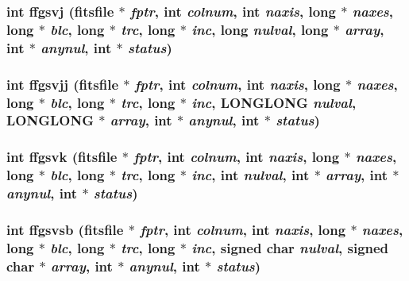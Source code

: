 \subsubsection{\setlength{\rightskip}{0pt plus 5cm}int ffgsvj (\bf{fitsfile} $\ast$ {\em fptr}, int {\em colnum}, int {\em naxis}, long $\ast$ {\em naxes}, long $\ast$ {\em blc}, long $\ast$ {\em trc}, long $\ast$ {\em inc}, long {\em nulval}, long $\ast$ {\em array}, int $\ast$ {\em anynul}, int $\ast$ {\em status})}\label{fitsio__64_8h_4dab3a6e95489f607d0e69dc0c5b0de2}


\subsubsection{\setlength{\rightskip}{0pt plus 5cm}int ffgsvjj (\bf{fitsfile} $\ast$ {\em fptr}, int {\em colnum}, int {\em naxis}, long $\ast$ {\em naxes}, long $\ast$ {\em blc}, long $\ast$ {\em trc}, long $\ast$ {\em inc}, \bf{LONGLONG} {\em nulval}, \bf{LONGLONG} $\ast$ {\em array}, int $\ast$ {\em anynul}, int $\ast$ {\em status})}\label{fitsio__64_8h_b11dce310951c2540223e1e021e4257d}


\subsubsection{\setlength{\rightskip}{0pt plus 5cm}int ffgsvk (\bf{fitsfile} $\ast$ {\em fptr}, int {\em colnum}, int {\em naxis}, long $\ast$ {\em naxes}, long $\ast$ {\em blc}, long $\ast$ {\em trc}, long $\ast$ {\em inc}, int {\em nulval}, int $\ast$ {\em array}, int $\ast$ {\em anynul}, int $\ast$ {\em status})}\label{fitsio__64_8h_af5457b13c2e0db0be99a6dd61c025dc}


\subsubsection{\setlength{\rightskip}{0pt plus 5cm}int ffgsvsb (\bf{fitsfile} $\ast$ {\em fptr}, int {\em colnum}, int {\em naxis}, long $\ast$ {\em naxes}, long $\ast$ {\em blc}, long $\ast$ {\em trc}, long $\ast$ {\em inc}, signed char {\em nulval}, signed char $\ast$ {\em array}, int $\ast$ {\em anynul}, int $\ast$ {\em status})}\label{fitsio__64_8h_9b640c1b98ee1cca47986fc97e10171e}


